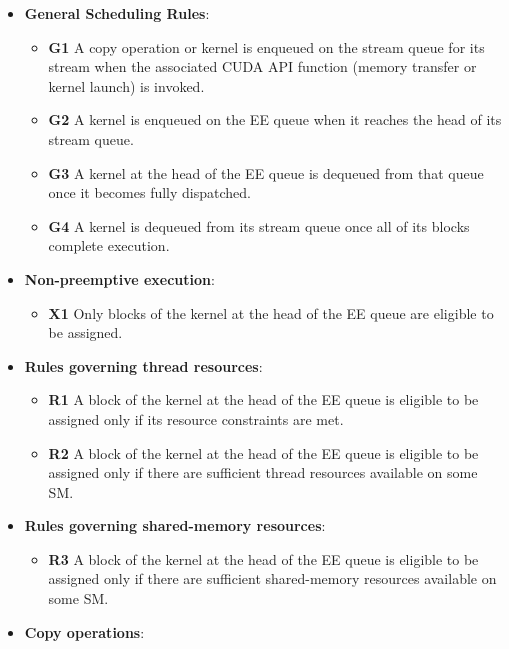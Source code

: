 \documentclass[
  12pt,
  a4paperpaper,
]{report}
\providecommand{\tightlist}{%
  \setlength{\itemsep}{0pt}\setlength{\parskip}{0pt}}
\begin{document}
\begin{itemize}
\tightlist
\item
  \textbf{General Scheduling Rules}:

  \begin{itemize}
  \tightlist
  \item
    \textbf{G1} A copy operation or kernel is enqueued on the stream
    queue for its stream when the associated CUDA API function (memory
    transfer or kernel launch) is invoked.
  \item
    \textbf{G2} A kernel is enqueued on the EE queue when it reaches the
    head of its stream queue.
  \item
    \textbf{G3} A kernel at the head of the EE queue is dequeued from
    that queue once it becomes fully dispatched.
  \item
    \textbf{G4} A kernel is dequeued from its stream queue once all of
    its blocks complete execution.
  \end{itemize}
\item
  \textbf{Non-preemptive execution}:

  \begin{itemize}
  \tightlist
  \item
    \textbf{X1} Only blocks of the kernel at the head of the EE queue
    are eligible to be assigned.
  \end{itemize}
\item
  \textbf{Rules governing thread resources}:

  \begin{itemize}
  \tightlist
  \item
    \textbf{R1} A block of the kernel at the head of the EE queue is
    eligible to be assigned only if its resource constraints are met.
  \item
    \textbf{R2} A block of the kernel at the head of the EE queue is
    eligible to be assigned only if there are sufficient thread
    resources available on some SM.
  \end{itemize}
\item
  \textbf{Rules governing shared-memory resources}:

  \begin{itemize}
  \tightlist
  \item
    \textbf{R3} A block of the kernel at the head of the EE queue is
    eligible to be assigned only if there are sufficient shared-memory
    resources available on some SM.
  \end{itemize}
\item
  \textbf{Copy operations}:


\end{itemize}
\end{document}
